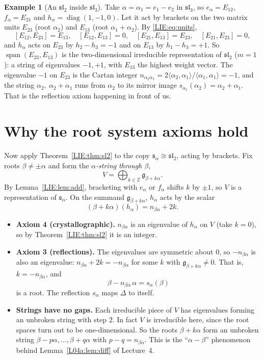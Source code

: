 \documentclass[11pt,openany]{book}
\theoremstyle{plain}
\theoremstyle{definition}
\newtheorem{example}[theorem]{Example}
\theoremstyle{remark}
\newcommand{\Z}{\mathbb{Z}}
\newcommand{\ip}[2]{\langle #1, #2\rangle}
\begin{document}
\begin{example}[An $\mathfrak{sl}_2$ inside $\mathfrak{sl}_3$]\label{LIE:ex:string}
Take $\alpha=\alpha_1=e_1-e_2$ in $\mathfrak{sl}_3$, so $e_\alpha=E_{12}$, $f_\alpha=E_{21}$ and
$h_\alpha=\operatorname{diag}(1,-1,0)$. Let it act by brackets on the two matrix units $E_{23}$ (root
$\alpha_2$) and $E_{13}$ (root $\alpha_1+\alpha_2$). By \eqref{LIE:eq:units},
\[
  [E_{12},E_{23}]=E_{13},\quad [E_{12},E_{13}]=0,\quad [E_{21},E_{13}]=E_{23},\quad [E_{21},E_{23}]=0,
\]
and $h_\alpha$ acts on $E_{23}$ by $h_2-h_3=-1$ and on $E_{13}$ by $h_1-h_3=+1$. So
$\operatorname{span}(E_{23},E_{13})$ is the two-dimensional irreducible representation of $\mathfrak{sl}_2$
($m=1$): a string of eigenvalues $-1,+1$, with $E_{13}$ the highest weight vector. The eigenvalue $-1$
on $E_{23}$ is the Cartan integer $n_{\alpha_2\alpha_1}=2\ip{\alpha_2}{\alpha_1}/\ip{\alpha_1}{\alpha_1}=-1$,
and the string $\alpha_2,\ \alpha_2+\alpha_1$ runs from $\alpha_2$ to its mirror image
$s_{\alpha_1}(\alpha_2)=\alpha_2+\alpha_1$. That is the reflection axiom happening in front of us.
\end{example}

\section{Why the root system axioms hold}
\label{LIE:sec:axioms}

Now apply Theorem~\ref{LIE:thm:sl2} to the copy $\mathfrak s_\alpha\cong\mathfrak{sl}_2$, acting by
brackets. Fix roots $\beta\neq\pm\alpha$ and form the \emph{$\alpha$-string through $\beta$},
\[
  V=\bigoplus_{k\in\Z}\mathfrak g_{\beta+k\alpha}.
\]
By Lemma~\ref{LIE:lem:add}, bracketing with $e_\alpha$ or $f_\alpha$ shifts $k$ by $\pm1$, so $V$ is a
representation of $\mathfrak s_\alpha$. On the summand $\mathfrak g_{\beta+k\alpha}$, $h_\alpha$ acts by the
scalar
\[
  (\beta+k\alpha)(h_\alpha)=n_{\beta\alpha}+2k .
\]

\begin{itemize}
\item \textbf{Axiom 4 (crystallographic).} $n_{\beta\alpha}$ is an eigenvalue of $h_\alpha$ on $V$
  (take $k=0$), so by Theorem~\ref{LIE:thm:sl2} it is an integer.
\item \textbf{Axiom 3 (reflections).} The eigenvalues are symmetric about $0$, so $-n_{\beta\alpha}$ is
  also an eigenvalue: $n_{\beta\alpha}+2k=-n_{\beta\alpha}$ for some $k$ with
  $\mathfrak g_{\beta+k\alpha}\neq0$. That is, $k=-n_{\beta\alpha}$, and
  \[
    \beta-n_{\beta\alpha}\,\alpha=s_\alpha(\beta)
  \]
  is a root. The reflection $s_\alpha$ maps $\Delta$ to itself.
\item \textbf{Strings have no gaps.} Each irreducible piece of $V$ has eigenvalues forming an unbroken
  string with step $2$. In fact $V$ is irreducible here, since the root spaces turn out to be
  one-dimensional. So the roots $\beta+k\alpha$ form an unbroken string $\beta-p\alpha,\dots,\beta+q\alpha$
  with $p-q=n_{\beta\alpha}$. This is the ``$\alpha-\beta$'' phenomenon behind Lemma~\ref{L04a:lem:diff} of Lecture~4.
\end{itemize}
\end{document}
